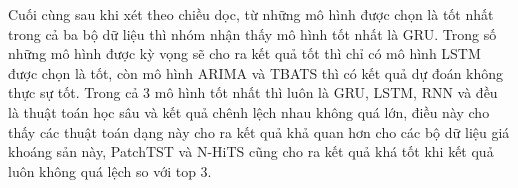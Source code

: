 \documentclass[conference]{IEEEtran}
\begin{document}
\begin{table}[h!]
    \centering
    \caption{\centering Bảng xếp hạng các mô hình được đánh giá theo chiều dọc}
    \label{table:models}
\end{table}

\indent Cuối cùng sau khi xét theo chiều dọc, từ những mô hình được chọn là tốt nhất trong cả ba bộ dữ liệu thì nhóm nhận thấy mô hình tốt nhất là GRU. Trong số những mô hình được kỳ vọng sẽ cho ra kết quả tốt thì chỉ có mô hình LSTM được chọn là tốt, còn mô hình ARIMA và TBATS thì có kết quả dự đoán không thực sự tốt. Trong cả 3 mô hình tốt nhất thì luôn là GRU, LSTM, RNN và đều là thuật toán học sâu và kết quả chênh lệch nhau không quá lớn, điều này cho thấy các thuật toán dạng này cho ra kết quả khả quan hơn cho các bộ dữ liệu giá khoáng sản này, PatchTST và N-HiTS cũng cho ra kết quả khá tốt khi kết quả luôn không quá lệch so với top 3.
\end{document}
